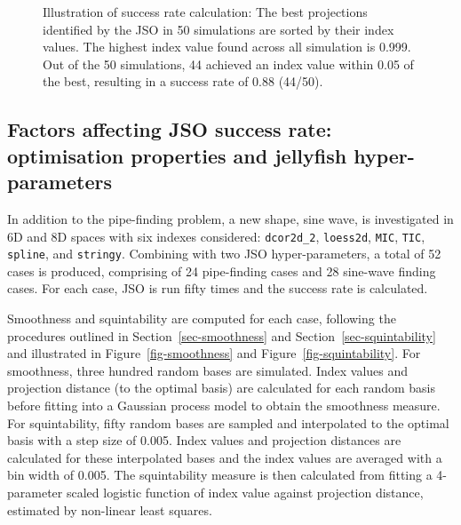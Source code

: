 \documentclass[
  number,
  preprint,
  3p]{elsarticle}
\begin{document}
\begin{figure}


\caption{\label{fig-success-rate}Illustration of success rate
calculation: The best projections identified by the JSO in 50
simulations are sorted by their index values. The highest index value
found across all simulation is 0.999. Out of the 50 simulations, 44
achieved an index value within 0.05 of the best, resulting in a success
rate of 0.88 (44/50).}

\end{figure}%

\subsection{Factors affecting JSO success rate: optimisation properties
and jellyfish hyper-parameters}\label{sec-app-2}

In addition to the pipe-finding problem, a new shape, sine wave, is
investigated in 6D and 8D spaces with six indexes considered:
\texttt{dcor2d\_2}, \texttt{loess2d}, \texttt{MIC}, \texttt{TIC},
\texttt{spline}, and \texttt{stringy}. Combining with two JSO
hyper-parameters, a total of 52 cases is produced, comprising of 24
pipe-finding cases and 28 sine-wave finding cases. For each case, JSO is
run fifty times and the success rate is calculated.

Smoothness and squintability are computed for each case, following the
procedures outlined in Section~\ref{sec-smoothness} and
Section~\ref{sec-squintability} and illustrated in
Figure~\ref{fig-smoothness} and Figure~\ref{fig-squintability}. For
smoothness, three hundred random bases are simulated. Index values and
projection distance (to the optimal basis) are calculated for each
random basis before fitting into a Gaussian process model to obtain the
smoothness measure. For squintability, fifty random bases are sampled
and interpolated to the optimal basis with a step size of 0.005. Index
values and projection distances are calculated for these interpolated
bases and the index values are averaged with a bin width of 0.005. The
squintability measure is then calculated from fitting a 4-parameter
scaled logistic function of index value against projection distance,
estimated by non-linear least squares.
\end{document}
